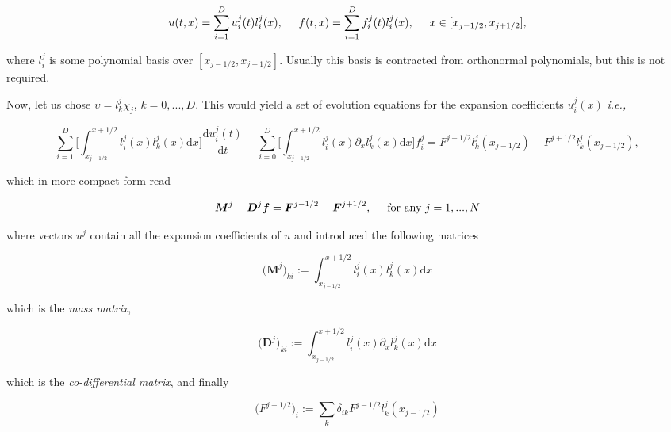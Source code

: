 \begin{equation}
u(t,x) = \sum_{i=1}^{D}u_{i}^{j}(t)l_{i}^{j}(x), \hspace{5mm} f(t,x) = \sum_{i=1}^{D}f_{i}^{j}(t)l_{i}^{j}(x), \hspace{5mm} x\in[x_{j-1/2}, x_{j+1/2}],
\end{equation}

where $l_{i}^{j}$ is some polynomial basis over $[x_{j-1/2}, x_{j+1/2}]$. 
Usually this basis is contracted from orthonormal polynomials, but this is not required. 

Now, let us chose $\upsilon = l_{k}^{j}\chi_j$, $k=0,...,D$. 
This would yield a set of evolution equations for the expansion coefficients $u_{i}^{j}(x)$ \textit{i.e.,}

\begin{equation}
\sum_{i=1}^{D}\Bigg[\int_{x_{j-1/2}}^{x+1/2}l_{i}^{j}(x)l_{k}^{j}(x)\text{d}x\Bigg]\frac{\text{d}u_{i}^{j}(t)}{\text{d}t} - \sum_{i=0}^{D}\Bigg[ \int_{x_{j-1/2}}^{x+1/2}l_{i}^{j}(x)\partial_{x}l_{k}^{j}(x)\text{d}x \Bigg]f_{i}^{j} = F^{j-1/2}l_{k}^{j}(x_{j-1/2}) - F^{j+1/2}l_{k}^{j}(x_{j-1/2}),
\end{equation}

which in more compact form read

\begin{equation}
\boldsymbol{M}^{j} - \boldsymbol{D}^{j}\boldsymbol{f} = \boldsymbol{F}^{j-1/2} - \boldsymbol{F}^{j+1/2}, \hspace{5mm} \text{for any } j=1,...,N
\end{equation}

where vectors $u^{j}$ contain all the expansion coefficients of $u$ and introduced the following matrices

\begin{equation}
\big(\boldsymbol{M}^j\big)_{ki} := \int_{x_{j-1/2}}^{x+1/2}l_{i}^{j}(x)l_{k}^{j}(x)\text{d}x
\end{equation}

which is the \textit{mass matrix}, 

\begin{equation}
\big(\boldsymbol{D}^{j}\big)_{ki} := \int_{x_{j-1/2}}^{x+1/2}l_{i}^{j}(x)\partial_{x}l_{k}^{j}(x)\text{d}x
\end{equation}

which is the \textit{co-differential matrix}, and finally 

\begin{equation}
\big(F^{j-1/2}\big)_i := \sum_{k} \delta_{ik} F^{j-1/2}l_{k}^{j}(x_{j-1/2})
\end{equation}

